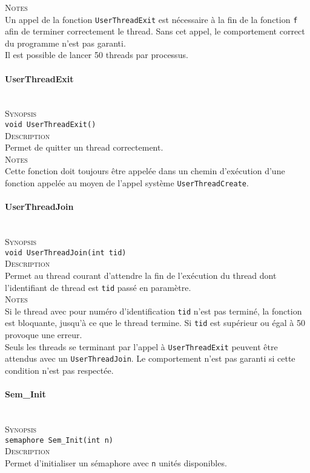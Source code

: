 \documentclass{report}
\newcommand{\myparagraph}[1]{\paragraph*{#1}\mbox{}\\}
\begin{document}
\textsc{Notes}\\
	Un appel de la fonction \texttt{UserThreadExit} est nécessaire à la fin de la fonction \texttt{f} afin de terminer correctement le thread. Sans cet appel, le comportement correct du programme n'est pas garanti.\\
	Il est possible de lancer 50 threads par processus.
	
	
	
	
	
\myparagraph{UserThreadExit}

\textsc{Synopsis}\\
	\texttt{void UserThreadExit()}\\
	
\textsc{Description}\\
	Permet de quitter un thread correctement.\\
	
\textsc{Notes}\\
	Cette fonction doit toujours être appelée dans un chemin d’exécution d'une fonction appelée au moyen de l'appel système \texttt{UserThreadCreate}.
	
	
	
	
	
\myparagraph{UserThreadJoin}

\textsc{Synopsis}\\
	\texttt{void UserThreadJoin(int tid)}\\
	
\textsc{Description}\\
	Permet au thread courant d'attendre la fin de l'exécution du thread dont l'identifiant de thread est \texttt{tid} passé en paramètre.\\
	
\textsc{Notes}\\
	Si le thread avec pour numéro d'identification \texttt{tid} n'est pas terminé, la fonction est bloquante, jusqu'à ce que le thread termine. Si \texttt{tid} est supérieur ou égal à 50 provoque une erreur.\\
Seuls les threads se terminant par l'appel à \texttt{UserThreadExit} peuvent être attendus avec un \texttt{UserThreadJoin}. Le comportement n'est pas garanti si cette condition n'est pas respectée.


\myparagraph{Sem\_Init}
	
	\textsc{Synopsis}\\
		\texttt{semaphore Sem\_Init(int n)}\\

\textsc{Description}\\
	Permet d'initialiser un sémaphore avec \texttt{n} unités disponibles.\\
	
\end{document}
